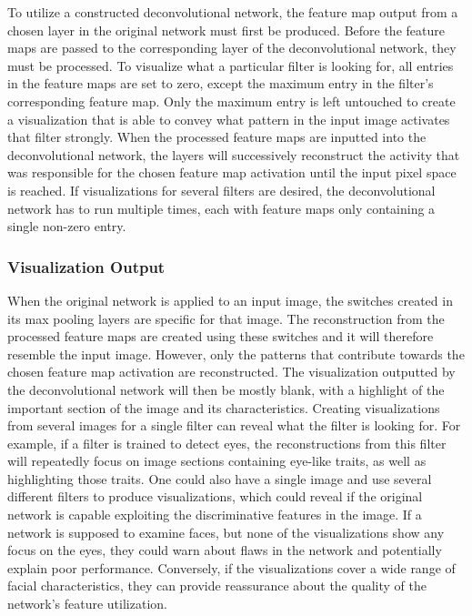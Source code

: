 To utilize a constructed deconvolutional network, the feature map output from a chosen layer in the original network must first be produced. Before the feature maps are passed to the corresponding layer of the deconvolutional network, they must be processed. To visualize what a particular filter is looking for, all entries in the feature maps are set to zero, except the maximum entry in the filter's corresponding feature map. Only the maximum entry is left untouched to create a visualization that is able to convey what pattern in the input image activates that filter strongly. When the processed feature maps are inputted into the deconvolutional network, the layers will successively reconstruct the activity that was responsible for the chosen feature map activation until the input pixel space is reached. If visualizations for several filters are desired, the deconvolutional network has to run multiple times, each with feature maps only containing a single non-zero entry. 

\subsubsection{Visualization Output}

When the original network is applied to an input image, the switches created in its max pooling layers are specific for that image. The reconstruction from the processed feature maps are created using these switches and it will therefore resemble the input image. However, only the patterns that contribute towards the chosen feature map activation are reconstructed. The visualization outputted by the deconvolutional network will then be mostly blank, with a highlight of the important section of the image and its characteristics. Creating visualizations from several images for a single filter can reveal what the filter is looking for. For example, if a filter is trained to detect eyes, the reconstructions from this filter will repeatedly focus on image sections containing eye-like traits, as well as highlighting those traits. One could also have a single image and use several different filters to produce visualizations, which could reveal if the original network is capable exploiting the discriminative features in the image. If a network is supposed to examine faces, but none of the visualizations show any focus on the eyes, they could warn about flaws in the network and potentially explain poor performance. Conversely, if the visualizations cover a wide range of facial characteristics, they can provide reassurance about the quality of the network's feature utilization. \\

